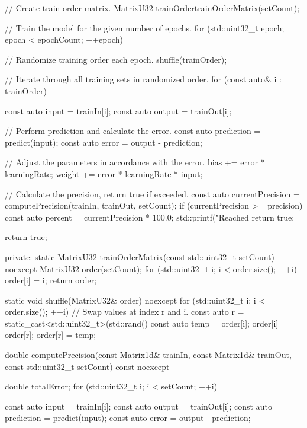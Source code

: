 \begin{cppcode}
{{{        // Create train order matrix.
        MatrixU32 trainOrder{trainOrderMatrix(setCount)};

        // Train the model for the given number of epochs.
        for (std::uint32_t epoch{}; epoch < epochCount; ++epoch)
        {
            // Randomize training order each epoch.
            shuffle(trainOrder);

            // Iterate through all training sets in randomized order.
            for (const auto& i : trainOrder)
            {
                const auto input  = trainIn[i];
                const auto output = trainOut[i];

                // Perform prediction and calculate the error.
                const auto prediction = predict(input);
                const auto error      = output - prediction;

                // Adjust the parameters in accordance with the error.
                bias   += error * learningRate;
                weight += error * learningRate * input;
            }

            // Calculate the precision, return true if exceeded.
            const auto currentPrecision = computePrecision(trainIn, trainOut, setCount);
            if (currentPrecision >= precision)
            {
                const auto percent = currentPrecision * 100.0;
                std::printf("Reached %
                return true;
            }
        }
        return true;
    }

private:
    static MatrixU32 trainOrderMatrix(const std::uint32_t setCount) noexcept
    {
        MatrixU32 order(setCount);
        for (std::uint32_t i{}; i < order.size(); ++i) { order[i] = i; }
        return order;
    }

    static void shuffle(MatrixU32& order) noexcept
    {
        for (std::uint32_t i{}; i < order.size(); ++i)
        {
            // Swap values at index r and i.
            const auto r    = static_cast<std::uint32_t>(std::rand() %
            const auto temp = order[i];
            order[i]        = order[r];
            order[r]        = temp;
        }
    }

    double computePrecision(const Matrix1d& trainIn, const Matrix1d& trainOut,
                            const std::uint32_t setCount) const noexcept
    {
        double totalError{};
        for (std::uint32_t i{}; i < setCount; ++i)
        {
            const auto input      = trainIn[i];
            const auto output     = trainOut[i];
            const auto prediction = predict(input);
            const auto error      = output - prediction;

}}}}
\end{cppcode}
